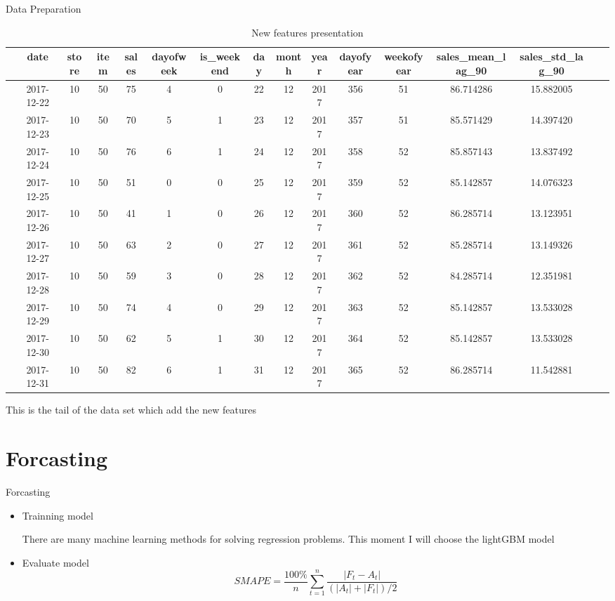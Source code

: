 \documentclass[
 size=12pt,
 paper=smartboard, %
 mode=present, %
 display=slides, %
style=tuliplab,
pauseslide,
fleqn,leqno]{powerdot}
\begin{document}
\begin{slide}{Data Preparation}
  \begin{table}[htbp]  \centering
    \tiny
    \caption{New features presentation}
    \label{tbl:1data information}
    \begin{tabular}{cccccccccccccccc}
      \hline
      & date & store & item & sales& dayofweek & is_weekend & day & month & year & dayofyear & weekofyear & sales_mean_lag_90 & sales_std_lag_90 \\
      \hline
     & 2017-12-22 & 10 & 50 & 75& 4& 0 & 22 & 12 & 2017 & 356 & 51 & 86.714286 & 15.882005 \\
     & 2017-12-23 & 10 & 50 & 70& 5& 1 & 23 & 12 & 2017 & 357 & 51 & 85.571429 & 14.397420 \\
     & 2017-12-24 & 10 & 50 & 76& 6& 1 & 24 & 12 & 2017 & 358 & 52 & 85.857143 & 13.837492 \\ 
     & 2017-12-25 & 10 & 50 & 51& 0& 0 & 25 & 12 & 2017 & 359 & 52 & 85.142857 & 14.076323 \\
     & 2017-12-26 & 10 & 50 & 41& 1& 0 & 26 & 12 & 2017 & 360 & 52 & 86.285714 & 13.123951 \\
     & 2017-12-27 & 10 & 50 & 63& 2& 0 & 27 & 12 & 2017 & 361 & 52 & 85.285714 & 13.149326 \\
     & 2017-12-28 & 10 & 50 & 59& 3& 0 & 28 & 12 & 2017 & 362 & 52 & 84.285714 & 12.351981 \\ 
     & 2017-12-29 & 10 & 50 & 74& 4& 0 & 29 & 12 & 2017 & 363 & 52 & 85.142857 & 13.533028 \\
     & 2017-12-30 & 10 & 50 & 62& 5& 1 & 30 & 12 & 2017 & 364 & 52 & 85.142857 & 13.533028 \\ 
     & 2017-12-31 & 10 & 50 & 82& 6& 1 & 31 & 12 & 2017 & 365 & 52 & 86.285714 & 11.542881 \\
      \hline 
    \end{tabular}
  \end{table}
\vspace{1cm}
This is the tail of the data set which add the new features
\end{slide}

\section{Forcasting}

\begin{slide}[toc=,bm=]{Forcasting}
\begin{itemize}
  \item Trainning model \ 

  There are many machine learning methods for solving regression problems. This moment I will choose the lightGBM model
  \item  Evaluate model
  \[SMAPE=\frac{100\%}{n}\sum_{t=1}^n\frac{|F_t-A_t|}{(|A_t|+|F_t|)/2} \]
\end{itemize}
\end{slide}
\end{document}
